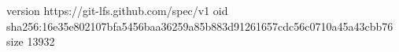 version https://git-lfs.github.com/spec/v1
oid sha256:16e35e802107bfa5456baa36259a85b883d91261657cdc56c0710a45a43cbb76
size 13932
